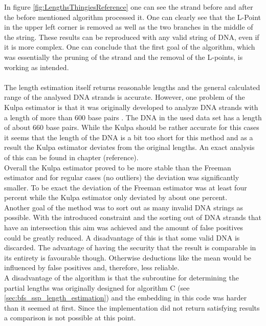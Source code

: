 \documentclass{article}
\begin{document}
In figure \ref{fig:LengthsThingiesReference} one can see the strand before and after the before mentioned algorithm processed it. One can clearly see that the L-Point in the upper left corner is removed as well as the two branches in the middle of the string. These results can be reproduced with any valid string of DNA, even if it is more complex. One can conclude that the first goal of the algorithm, which was essentially the pruning of the strand and the removal of the L-points, is working as intended. \\
\\
The length estimation itself returns reasonable lengths and the general calculated range of the analysed DNA strands is accurate. However, one problem of the Kulpa estimator is that it was originally developed to analyze DNA strands with a length of more than 600 base pairs \cite{rivetti2001accurate}. The DNA in the used data set has a length of about 660 base pairs. While the Kulpa should be rather accurate for this cases it seems that the length of the DNA is a bit too short for this method and as a result the Kulpa estimator deviates from the original lengths. An exact analysis of this can be found in chapter (reference).
\\
Overall the Kulpa estimator proved to be more stable than the Freeman estimator and for regular cases (no outliers) the deviation was significantly smaller. To be exact the deviation of the Freeman estimator was at least four percent while the Kulpa estimator only deviated by about one percent. 
\\
Another goal of the method was to sort out as many invalid DNA strings as possible. With the introduced constraint and the sorting out of DNA strands that have an intersection this aim was achieved and the amount of false positives could be greatly reduced. A disadvantage of this is that some valid DNA is discarded. The advantage of having the security that the result is comparable in its entirety is favourable though. Otherwise deductions like the mean would be influenced by false positives and, therefore, less reliable.
\\
A disadvantage of the algorithm is that the subroutine for determining the partial lengths was originally designed for algorithm C (see \ref{sec:bfs_ssp_length_estimation}) and the embedding in this code was harder than it seemed at first. Since the implementation did not return satisfying results a comparison is not possible at this point. 

\newpage
\end{document}
